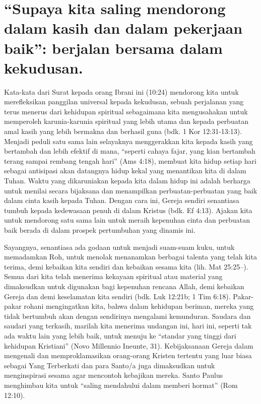 \section{``Supaya kita saling mendorong dalam kasih dan dalam pekerjaan baik'': berjalan bersama dalam kekudusan.}

Kata-kata dari Surat kepada orang Ibrani ini (10:24) mendorong kita untuk merefleksikan panggilan universal kepada kekudusan, sebuah perjalanan yang terus menerus dari kehidupan spiritual sebagaimana kita mengusahakan untuk memperoleh karunia-karunia spiritual yang lebih utama dan kepada perbuatan amal kasih yang lebih bermakna dan berhasil guna (bdk. 1 Kor 12:31-13:13). Menjadi peduli satu sama lain selayaknya menggerakkan kita kepada kasih yang bertambah dan lebih efektif di mana, ``seperti cahaya fajar, yang kian bertambah terang sampai rembang tengah hari'' (Ams 4:18), membuat kita hidup setiap hari sebagai antisipasi akan datangnya hidup kekal yang menantikan kita di dalam Tuhan. Waktu yang dikaruniakan kepada kita dalam hidup ini adalah berharga untuk menilai secara bijaksana dan menampilkan perbuatan-perbuatan yang baik dalam cinta kasih kepada Tuhan. Dengan cara ini, Gereja sendiri senantiasa tumbuh kepada kedewasaan penuh di dalam Kristus (bdk. Ef 4:13). Ajakan kita untuk mendorong satu sama lain untuk meraih kepenuhan cinta dan perbuatan baik berada di dalam prospek pertumbuhan yang dinamis ini.

Sayangnya, senantiasa ada godaan untuk menjadi suam-suam kuku, untuk memadamkan Roh, untuk menolak menanamkan berbagai talenta yang telah kita terima, demi kebaikan kita sendiri dan kebaikan sesama kita (lih. Mat 25:25–). Semua dari kita telah menerima kekayaan spiritual atau material yang dimaksudkan untuk digunakan bagi kepenuhan rencana Allah, demi kebaikan Gereja dan demi keselamatan kita sendiri (bdk. Luk 12:21b; 1 Tim 6:18). Pakar-pakar rohani mengingatkan kita, bahwa dalam kehidupan beriman, mereka yang tidak bertumbuh akan dengan sendirinya mengalami kemunduran. Saudara dan saudari yang terkasih, marilah kita menerima undangan ini, hari ini, seperti tak ada waktu lain yang lebih baik, untuk menuju ke ``standar yang tinggi dari kehidupan Kristiani'' (Novo Millennio Ineunte, 31). Kebijaksanaan Gereja dalam mengenali dan memproklamasikan orang-orang Kristen tertentu yang luar biasa sebagai Yang Terberkati dan para Santo/a juga dimaksudkan untuk menginspirasi sesama agar mencontoh kebajikan mereka. Santo Paulus menghimbau kita untuk ``saling mendahului dalam memberi hormat'' (Rom 12:10).

